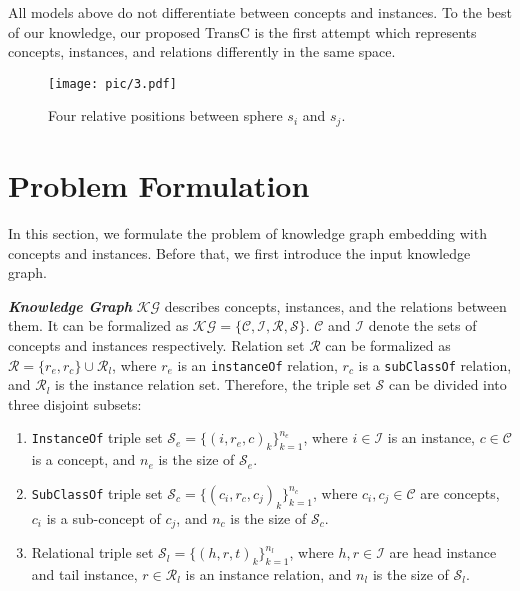 \documentclass[11pt,a4paper]{article}
\begin{document}
  All models above do not differentiate between concepts and instances. 
  To the best of our knowledge, our proposed TransC is the first attempt which represents concepts, instances, and relations differently in the same space.
  
  \begin{figure*}[ht] 
    \centering
    \setlength{\abovecaptionskip}{2pt}
    \setlength{\belowcaptionskip}{0pt}
    \texttt{[image: pic/3.pdf]}\\
    \caption{Four relative positions between sphere $s_i$ and $s_j$.}
    \label{four_position}
    \end{figure*}
   
  \section{Problem Formulation}
  
  In this section, we formulate the problem of knowledge graph embedding 
  with concepts and instances. Before that, we first introduce the input knowledge graph.
  
  \textit{\textbf{Knowledge Graph}} $\mathcal{KG}$ describes concepts, instances, and the relations between them.
  It can be formalized as $\mathcal{KG} = \{\mathcal{C}, \mathcal{I}, \mathcal{R}, \mathcal{S}\}$. $\mathcal{C}$ and $\mathcal{I}$ denote the 
  sets of concepts and instances respectively. Relation set $\mathcal{R}$ can be formalized as $\mathcal{R} = \{r_e, r_c\} \cup \mathcal{R}_l$,
  where $r_e$ is an \texttt{instanceOf} relation, $r_c$ is a \texttt{subClassOf} relation, and $\mathcal{R}_l$ is the instance relation set.
  Therefore, the triple set $\mathcal{S}$ can be divided into three disjoint subsets: 
  
  \begin{enumerate}
    \item \texttt{InstanceOf} triple set $\mathcal{S}_e = \{(i, r_e, c)_k\}_{k=1}^{n_e}$, where $i \in \mathcal{I}$ is an instance, 
    $c \in \mathcal{C}$ is a concept, and $n_e$ is the size of $\mathcal{S}_e$.
    \item \texttt{SubClassOf} triple set $\mathcal{S}_c = \{(c_{i}, r_c, c_{j})_k\}_{k=1}^{n_c}$, where $c_i, c_j \in \mathcal{C}$ 
    are concepts, $c_i$ is a sub-concept of $c_j$, and $n_c$ is the size of $\mathcal{S}_c$.
    \item Relational triple set $\mathcal{S}_l = \{(h, r, t)_k\}_{k=1}^{n_l}$, where $h, r \in \mathcal{I}$ are head instance 
    and tail instance, $r \in \mathcal{R}_l$ is an instance relation, and $n_l$ is the size of $\mathcal{S}_l$.
  \end{enumerate} 
  
\end{document}
